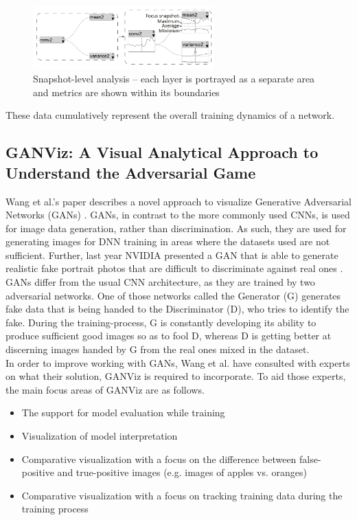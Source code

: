 \documentclass{acmsiggraph}               %
\begin{document}
\begin{figure}[!htb]
  \centering
  \includegraphics[width=2.75in]{mengchen2}
  \caption{Snapshot-level analysis -- each layer is portrayed as a separate area and metrics are shown within its boundaries \protect\cite{Liu2018}}
  \label{fig:mengchen2}
\end{figure}

These data cumulatively represent the overall training dynamics of a network.

\subsection{GANViz: A Visual Analytical Approach to Understand the Adversarial Game}
Wang et al.'s paper describes a novel approach to visualize Generative Adversarial Networks (GANs) \protect\cite{Wang}. GANs, in contrast to the more commonly used CNNs, is used for image data generation, rather than discrimination. As such, they are used for generating images for DNN training in areas where the datasets used are not sufficient. Further, last year NVIDIA presented a GAN that is able to generate realistic fake portrait photos that are difficult to discriminate against real ones \protect\cite{KarrasNVIDIA}. 
GANs differ from the usual CNN architecture, as they are trained by two adversarial networks. One of those networks called the Generator (G) generates fake data that is being handed to the Discriminator (D), who tries to identify the fake. During the training-process, G is constantly developing its ability to produce sufficient good images so as to fool D, whereas D is getting better at discerning images handed by G from the real ones mixed in the dataset.\\

In order to improve working with GANs, Wang et al. have consulted with experts on what their solution, GANViz is required to incorporate. To aid those experts, the main focus areas of GANViz are as follows.

\begin{itemize}
  \item The support for model evaluation while training
  \item Visualization of model interpretation
  \item Comparative visualization with a focus on the difference between false-positive and true-positive images (e.g. images of apples vs. oranges)
  \item Comparative visualization with a focus on tracking training data during the training process
\end{itemize}
\end{document}
